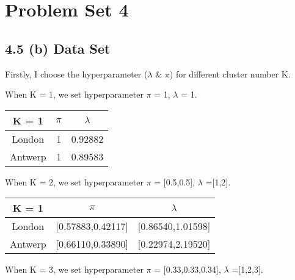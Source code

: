 \documentclass[12pt]{myarticle}
\begin{document}

\section*{Problem Set 4}
\subsection*{4.5 (b) Data Set}
Firstly, I choose the hyperparameter ($\lambda$ \& $\pi$) for different cluster number K.

When K = 1, we set hyperparameter $\pi$ = 1, $\lambda$ = 1.

\begin{table}[H]
    \centering
    \begin{tabular}{|c|c|c|}
    \hline
    K = 1       & $\pi$ & $\lambda$  \\ \hline
    London & 1  & 0.92882 \\ \hline
    Antwerp & 1  & 0.89583 \\ \hline
    \end{tabular}
\end{table}

When K = 2, we set hyperparameter $\pi$ = [0.5,0.5], $\lambda$ =[1,2].

\begin{table}[H]
    \centering
    \begin{tabular}{|c|c|c|}
    \hline
    K = 1       & $\pi$  & $\lambda$  \\ \hline
    London & [0.57883,0.42117]  & [0.86540,1.01598] \\ \hline
    Antwerp & [0.66110,0.33890]  & [0.22974,2.19520] \\ \hline
    \end{tabular}
\end{table}

When K = 3, we set hyperparameter $\pi$ = [0.33,0.33,0.34], $\lambda$ =[1,2,3].
\end{document}
